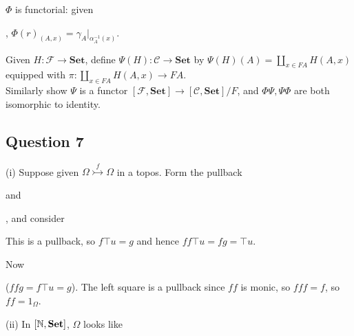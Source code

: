 \documentclass[a4paper]{article}
\begin{document}
$\Phi$ is functorial: given 

, $\Phi(r)_(A,x) = \gamma_A |_{\alpha_A^{-1}(x)}$.

Given $H:\mathcal{F} \to \mathbf{Set}$, define $\Psi(H):\mathcal{C} \to \mathbf{Set}$ by $\Psi(H)(A) = \coprod_{x \in FA} H(A,x)$ equipped with $\pi:\coprod_{x \in FA} H(A,x) \to FA$.\\
Similarly show $\Psi$ is a functor $[\mathcal{F},\mathbf{Set}] \to [\mathcal{C},\mathbf{Set}]/F$, and $\Phi\Psi,\Psi\Phi$ are both isomorphic to identity.

\subsection{Question 7}
(i) Suppose given $\Omega \stackrel{f}{\rightarrowtail} \Omega$ in a topos. Form the pullback
and
, and consider


This is a pullback, so $f\top u = g$ and hence $ff\top u = fg = \top u$.

Now 

($ffg=f\top u = g$). The left square is a pullback since $ff$ is monic, so $fff=f$, so $ff=1_\Omega$.

(ii) In $[\mathbb{N}, \mathbf{Set}]$, $\Omega$ looks like
\end{document}

